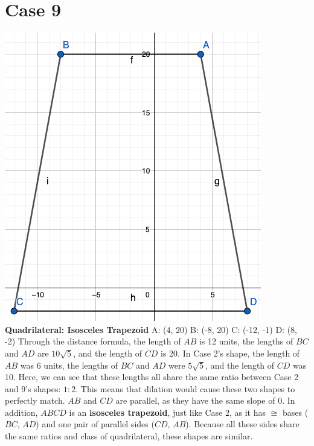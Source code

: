 \documentclass{article}
\begin{document}
	\section*{Case 9}
	\includegraphics[scale=0.3]{pics/Case9} \newline
	\textbf{Quadrilateral: Isosceles Trapezoid} \newline
	A: (4, 20) B: (-8, 20) C: (-12, -1) D: (8, -2) \newline
	Through the distance formula, the length of $AB$ is 12 units, the lengths of $BC$ and $AD$ are $10\sqrt{5}$, and the length of $CD$ is 20. \newline
	In Case 2's shape, the length of $AB$ was 6 units, the lengths of $BC$ and $AD$ were $5\sqrt{5}$, and the length of $CD$ was 10. \newline
	Here, we can see that these lengths all share the same ratio between Case 2 and 9's shapes: $1:2$. \newline
	This means that dilation would cause these two shapes to perfectly match. \newline
	$AB$ and $CD$ are parallel, as they have the same slope of 0. \newline
	In addition, $ABCD$ is an \textbf{isosceles trapezoid}, just like Case 2, as it has $\cong$ bases ($BC$, $AD$) and one pair of parallel sides ($CD$, $AB$). \newline
	Because all these sides share the same ratios and class of quadrilateral, these shapes are similar.
	
\end{document}

